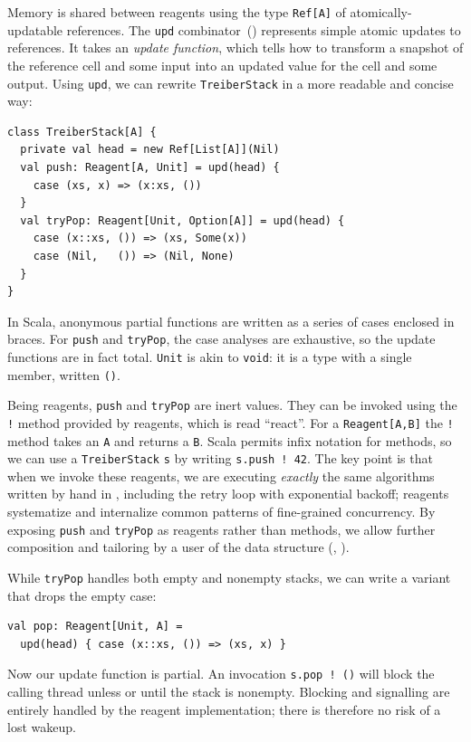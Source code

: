 \documentclass[preprint,nocopyrightspace]{sigplanconf}
\begin{document}
Memory is shared between reagents using the type \lstinline{Ref[A]} of
atomically-updatable references.
The \lstinline{upd} combinator~() represents simple atomic
updates to references.  It takes an \emph{update function}, which tells how to
transform a snapshot of the reference cell and some input into an updated
value for the cell and some output.  Using \lstinline{upd}, we can rewrite
\lstinline{TreiberStack} in a more readable and concise way:
\begin{lstlisting}
class TreiberStack[A] {
  private val head = new Ref[List[A]](Nil)
  val push: Reagent[A, Unit] = upd(head) {
    case (xs, x) => (x:xs, ())
  }
  val tryPop: Reagent[Unit, Option[A]] = upd(head) {
    case (x::xs, ()) => (xs, Some(x))
    case (Nil,   ()) => (Nil, None)
  }
}
\end{lstlisting}
In Scala, anonymous partial functions are written as a series of cases
enclosed in braces.  For \lstinline{push} and \lstinline{tryPop}, the case
analyses are exhaustive, so the update functions are in fact total.
\lstinline{Unit} is akin to \lstinline{void}: it is a type with a single
member, written \lstinline{()}.

Being reagents, \lstinline{push} and \lstinline{tryPop} are inert values.  They
can be invoked using the \lstinline{!} method provided by reagents, which is
read ``react''.  For a \lstinline{Reagent[A,B]} the \lstinline{!} method takes
an \lstinline{A} and returns a \lstinline{B}.  Scala permits infix notation for
methods, so we can use a \lstinline{TreiberStack} \lstinline{s} by writing
\lstinline{s.push ! 42}.  The key point is that when we invoke these reagents,
we are executing \emph{exactly} the same algorithms written by hand in
, including the retry loop with exponential backoff; reagents
systematize and internalize common patterns of fine-grained concurrency.  By
exposing \lstinline{push} and \lstinline{tryPop} as reagents rather than
methods, we allow further composition and tailoring by a user of the data
structure (, ).

While \lstinline{tryPop} handles both empty and nonempty stacks, we
can write a variant that drops the empty case:
\begin{lstlisting}
val pop: Reagent[Unit, A] = 
  upd(head) { case (x::xs, ()) => (xs, x) }
\end{lstlisting}
Now our update function is partial.  An invocation \lstinline{s.pop ! ()} will
block the calling thread unless or until the stack is nonempty.  Blocking and
signalling are entirely handled by the reagent implementation; there is
therefore no risk of a lost wakeup.  %
\end{document}
